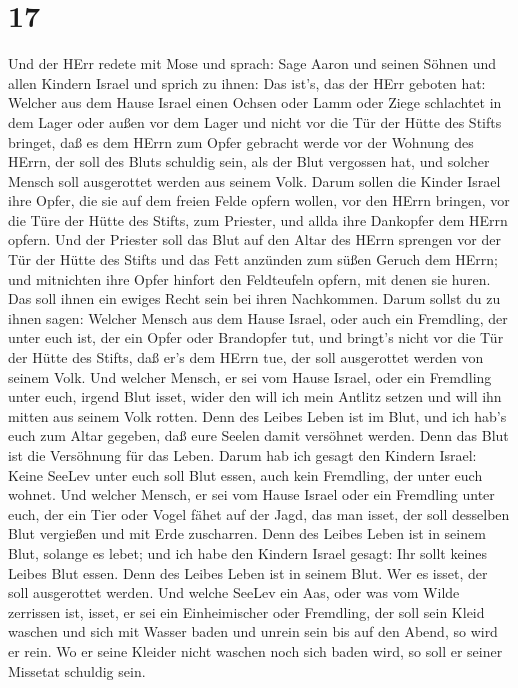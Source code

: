 \hypertarget{section-16}{%
\section{17}\label{section-16}}

 Und der HErr redete mit Mose und sprach:  Sage
Aaron und seinen Söhnen und allen Kindern Israel und sprich zu ihnen:
Das ist's, das der HErr geboten hat:  Welcher aus dem Hause
Israel einen Ochsen oder Lamm oder Ziege schlachtet in dem Lager oder
außen vor dem Lager  und nicht vor die Tür der Hütte des
Stifts bringet, daß es dem HErrn zum Opfer gebracht werde vor der
Wohnung des HErrn, der soll des Bluts schuldig sein, als der Blut
vergossen hat, und solcher Mensch soll ausgerottet werden aus seinem
Volk.  Darum sollen die Kinder Israel ihre Opfer, die sie
auf dem freien Felde opfern wollen, vor den HErrn bringen, vor die Türe
der Hütte des Stifts, zum Priester, und allda ihre Dankopfer dem HErrn
opfern.  Und der Priester soll das Blut auf den Altar des
HErrn sprengen vor der Tür der Hütte des Stifts und das Fett anzünden
zum süßen Geruch dem HErrn;  und mitnichten ihre Opfer
hinfort den Feldteufeln opfern, mit denen sie huren. Das soll ihnen ein
ewiges Recht sein bei ihren Nachkommen.  Darum sollst du zu
ihnen sagen: Welcher Mensch aus dem Hause Israel, oder auch ein
Fremdling, der unter euch ist, der ein Opfer oder Brandopfer tut,
 und bringt's nicht vor die Tür der Hütte des Stifts, daß
er's dem HErrn tue, der soll ausgerottet werden von seinem Volk.
 Und welcher Mensch, er sei vom Hause Israel, oder ein
Fremdling unter euch, irgend Blut isset, wider den will ich mein Antlitz
setzen und will ihn mitten aus seinem Volk rotten.  Denn
des Leibes Leben ist im Blut, und ich hab's euch zum Altar gegeben, daß
eure Seelen damit versöhnet werden. Denn das Blut ist die Versöhnung für
das Leben.  Darum hab ich gesagt den Kindern Israel: Keine
SeeLev unter euch soll Blut essen, auch kein Fremdling, der unter euch
wohnet.  Und welcher Mensch, er sei vom Hause Israel oder
ein Fremdling unter euch, der ein Tier oder Vogel fähet auf der Jagd,
das man isset, der soll desselben Blut vergießen und mit Erde
zuscharren.  Denn des Leibes Leben ist in seinem Blut,
solange es lebet; und ich habe den Kindern Israel gesagt: Ihr sollt
keines Leibes Blut essen. Denn des Leibes Leben ist in seinem Blut. Wer
es isset, der soll ausgerottet werden.  Und welche SeeLev
ein Aas, oder was vom Wilde zerrissen ist, isset, er sei ein
Einheimischer oder Fremdling, der soll sein Kleid waschen und sich mit
Wasser baden und unrein sein bis auf den Abend, so wird er rein.
 Wo er seine Kleider nicht waschen noch sich baden wird, so
soll er seiner Missetat schuldig sein.

